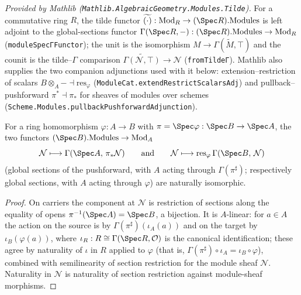 \begin{lemma}
  \label{lem:tilde_gamma_adjunction_mathlib}
  \mathlibok
  \textit{Provided by Mathlib (\texttt{Mathlib.AlgebraicGeometry.Modules.Tilde}).}
  For a commutative ring \(R\), the tilde functor
  \(\widetilde{(\cdot)} : \mathrm{Mod}_{R} \to (\Spec R).\mathrm{Modules}\)
  is left adjoint to the global-sections functor
  \(\Gamma(\Spec R, -) : (\Spec R).\mathrm{Modules} \to \mathrm{Mod}_{R}\)
  (\texttt{moduleSpecΓFunctor}); the unit is the isomorphism
  \(M \to \Gamma(\widetilde M, \top)\) and the counit is the
  tilde--\(\Gamma\) comparison
  \(\widetilde{\Gamma(\mathcal N, \top)} \to \mathcal N\)
  (\texttt{fromTildeΓ}). Mathlib also supplies the two companion
  adjunctions used with it below: extension--restriction of scalars
  \(B \otimes_A - \dashv \mathrm{res}_\varphi\)
  (\texttt{ModuleCat.extendRestrictScalarsAdj}) and
  pullback--pushforward \(\pi^* \dashv \pi_*\) for sheaves of modules
  over schemes (\texttt{Scheme.Modules.pullbackPushforwardAdjunction}).
\end{lemma}

\begin{lemma}
  \label{lem:pullbackTilde_gammaBridge}
  \leanok
  For a ring homomorphism \(\varphi : A \to B\) with
  \(\pi = \Spec\varphi : \Spec B \to \Spec A\), the two functors
  \((\Spec B).\mathrm{Modules} \to \mathrm{Mod}_{A}\)
  \[
    \mathcal N \longmapsto \Gamma(\Spec A,\, \pi_{*}\mathcal N)
    \qquad\text{and}\qquad
    \mathcal N \longmapsto \mathrm{res}_{\varphi}\, \Gamma(\Spec B,\, \mathcal N)
  \]
  (global sections of the pushforward, with \(A\) acting through
  \(\Gamma(\pi^{\sharp})\); respectively global sections, with \(A\)
  acting through \(\varphi\)) are naturally isomorphic.
\end{lemma}
\begin{proof}
  \leanok
  On carriers the component at \(\mathcal N\) is restriction of sections
  along the equality of opens \(\pi^{-1}(\Spec A) = \Spec B\), a
  bijection. It is \(A\)-linear: for \(a \in A\) the action on the
  source is by \(\Gamma(\pi^{\sharp})(\iota_A(a))\) and on the target by
  \(\iota_B(\varphi(a))\), where
  \(\iota_R : R \cong \Gamma(\Spec R, \mathcal O)\) is the canonical
  identification; these agree by naturality of \(\iota\) in \(R\)
  applied to \(\varphi\) (that is,
  \(\Gamma(\pi^{\sharp}) \circ \iota_A = \iota_B \circ \varphi\)),
  combined with semilinearity of section restriction for the module
  sheaf \(\mathcal N\). Naturality in \(\mathcal N\) is naturality of
  section restriction against module-sheaf morphisms.
\end{proof}

